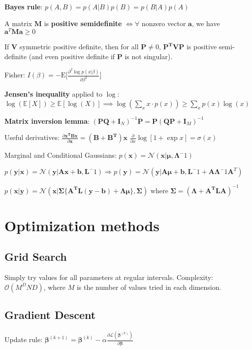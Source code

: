 \documentclass[10pt,a4paper,landscape]{article}
\renewcommand{\bf}[1]{\ensuremath{\mathbf{#1}}}
\newcommand{\E}{\mathrm{E}}
\newcommand{\bbeta}{\boldsymbol\beta}
\begin{document}
\begin{multicols*}{4}
\textbf{Bayes rule}: $p(A, B) = p(A|B) p(B) = p(B|A) p(A)$

A matrix $\bf{M}$ is \textbf{positive semidefinite} $\iff \forall$ nonzero vector $\bf{a}$, we have $\bf{a}^T \bf{M} \bf{a} \geq 0$

If $\bf{V}$ symmetric positive definite, then for all $\bf{P} \neq 0$, $\bf{P^T V P}$ is positive semi-definite (and even positive definite if $\bf{P}$ is not singular).

Fisher: $I(\beta) = -\E\biggl[\frac{\partial^2 \log p(x|\beta)}{\partial\beta^2}\biggr]$

\textbf{Jensen's inequality} applied to $\log$: $\log( \mathbb{E}[X] ) \geq \mathbb{E}[\log(X)]
\implies \log ( \sum_x x \cdot p(x) ) \geq \sum_x p(x) \log(x)$

\textbf{Matrix inversion lemma}: $(\bf{PQ} + \bf{I}_N)^{-1} \bf{P} = \bf{P}(\bf{QP} + \bf{I}_M)^{-1}$

Useful derivatives: $\frac{\partial \bf{x^T B x}}{\partial \bf{x}} = (\bf{B + B^T}) \bf{x}$
$\frac{\partial}{\partial x} \log[1+\exp{x}] = \sigma(x)$

Marginal and Conditional Gaussians:
$p(\bf{x}) = \mathcal{N}(\bf{x} | \boldsymbol\mu, \boldsymbol\Lambda^-1)$ 

$p(\bf{y}|\bf{x}) = \mathcal{N}(\bf{y} | \bf{Ax + b, L}^-1)
\Rightarrow
p(\bf{y}) = \mathcal{N}(\bf{y} | \bf{A} \boldsymbol\mu + \bf{b}, \bf{L}^-1 + \bf{A} \boldsymbol\Lambda^-1 \bf{A}^T)$

$p(\bf{x}|\bf{y}) = \mathcal{N}(\bf{x} |\boldsymbol\Sigma \{ \bf{A^T L(y - b) + \Lambda \mu} \}, \boldsymbol\Sigma)
\text{ where } \boldsymbol\Sigma = (\boldsymbol\Lambda + \bf{A^T L A})^{-1}
$

\section{Optimization methods}

\subsection{Grid Search}
Simply try values for all parameters at regular intervals.
Complexity: $\mathcal{O}(M^D N D)$, where $M$ is the number of values tried in each dimension.

\subsection{Gradient Descent}
Update rule: $\bbeta^{(k+1)} = \bbeta^{(k)} - \alpha \frac{\partial \mathcal{L}(\bbeta^{(k)})}{\partial \bbeta}$


\end{multicols*}
\end{document}
